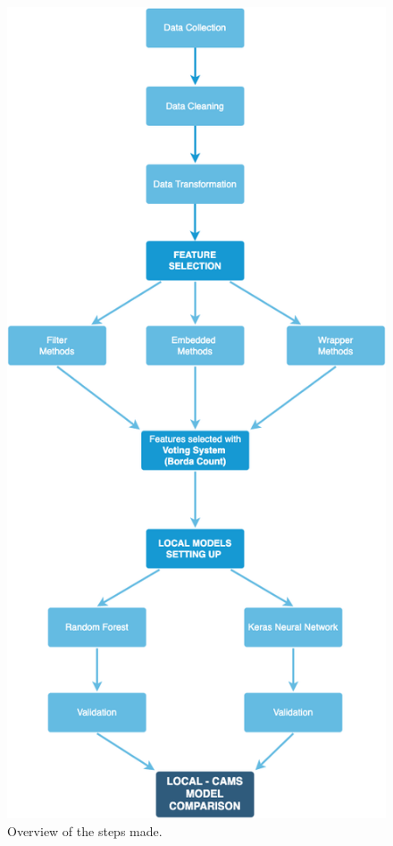 \begin{figure}[H]
    \centering
    \includegraphics[scale=0.35]{images/overview.png}
    \caption{Overview of the steps made.}
    \label{fig:overview}
\end{figure}


